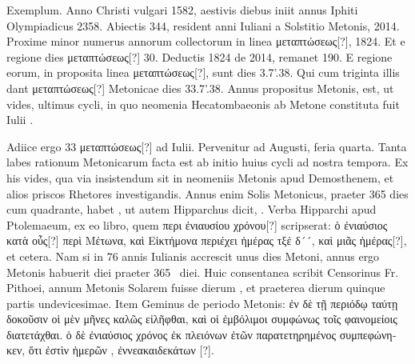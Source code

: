Exemplum.
Anno Christi
vulgari 1582, aestivis diebus iniit annus Iphiti
Olympiadicus 2358.
Abiectis 344, resident anni
Iuliani a Solstitio Metonis, 2014.
Proxime minor
numerus annorum collectorum in linea \textgreek{μεταπτώσεως[?]},
1824.
Et e regione dies \textgreek{μεταπτώσεως[?]} 30.
Deductis 1824 de 2014, remanet 190.
E regione
eorum, in proposita linea \textgreek{μεταπτώσεως[?]}, sunt dies
3.7'.38.
Qui cum triginta illis dant \textgreek{μεταπτώσεως[?]}
Metonicae dies 33.7'.38.
Annus propositus Metonis,
est, ut vides, ultimus cycli, in quo neomenia
Hecatombaeonis ab Metone constituta fuit
Iulii .

Adiice ergo 33 \textgreek{μεταπτώσεως[?]}
 ad  Iulii.
Pervenitur ad
 Augusti, feria quarta.
Tanta labes rationum Metonicarum facta
est ab initio huius cycli ad nostra tempora.
Ex his vides, qua via
insistendum sit in neomeniis Metonis apud Demosthenem, et alios
priscos Rhetores investigandis.
Annus enim Solis Metonicus, praeter
365 dies cum quadrante, habet , ut autem Hipparchus dicit,
 .
Verba
Hipparchi apud Ptolemaeum, ex eo libro, quem \textgreek{περι ἐνιαυσίου χρόνου[?]}
scripserat: \textgreek{ὁ ἐνιαύσιος κατὰ οὖς[?] περὶ Μέτωνα,
 καὶ Εἰκτήμονα περιέχει ἡμέρας
τξέ δ´´, καὶ  μιᾶς ἡμέρας[?]}, et cetera.
Nam si in 76 annis Iulianis accrescit
unus dies Metoni, annus ergo Metonis habuerit  diei praeter
 365~
diei.
Huic consentanea scribit Censorinus Fr. %
Pithoei, annum Metonis
Solarem fuisse dierum , et praeterea dierum quinque
partis undevicesimae.
Item Geminus de periodo Metonis: \textgreek{ἐν δὲ
τῇ περιόδῳ ταύτῃ δοκοῦσιν οἱ μὲν μῆνες καλῶς εἰλῆφθαι, καὶ οἱ ἐμβόλιμοι
συμφώνως τοῖς φαινομείοις διατετάχθαι. ὁ δὲ ἐνιαύσιος χρόνος ἐκ πλειόνων
ἐτῶν παρατετηρημένος συμπεφώνηκεν, ὅτι ἐστὶν ἡμερῶν },
 \textgreek{ἐννεακαιδεκάτων } [?].
